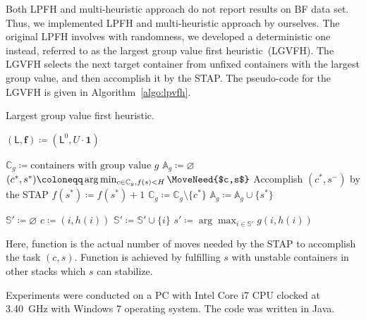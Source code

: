 \documentclass[review,3p,times,12pt,number]{elsarticle}\usepackage{amsmath}\usepackage{amssymb}
\renewcommand{\gets}{\coloneqq}
\newcommand{\setalgo}{\linespread{1}\fontsize{10}{12}\selectfont}
\begin{document}
Both LPFH and multi-heuristic approach do not report results on BF data set. Thus, we implemented LPFH and multi-heuristic approach by ourselves.
The original LPFH involves with randomness, we developed a deterministic one instead, referred to as the largest group value first heuristic~(LGVFH). The LGVFH selects the next target container from unfixed containers with the largest group value, and then accomplish it by the STAP\@. The pseudo-code for the LGVFH is given in Algorithm~\ref{algo:lpvfh}.

\begin{algorithm*}[htbp]
\caption{Largest group value first heuristic.}
\label{algo:lpvfh}


\setalgo

\begin{multicols}{2}

\Begin
{
  $(\mathsf{L},\boldsymbol{f})\gets (\mathsf{L}^0,U\cdot\boldsymbol{1})$\;

  {
    $\mathbb{C}_g\gets\textrm{containers with group value $g$}$\;
    $\mathbb{A}_g\gets\varnothing$
    {
      $(c^*, s^*)\gets \arg\min_{c\in\mathbb{C}_g, f(s)<H} \MoveNeed{$c,s$}$\;
      Accomplish $( c^*, s^-)$ by the STAP\;
      $f(s^*)\gets f(s^*)+1$\;
      $\mathbb{C}_g\gets\mathbb{C}_g\setminus\{c^*\}$\;
      $\mathbb{A}_g\gets \mathbb{A}_g\cup \{s^*\}$\;
    }
    {
    	\;
    }
  }
}



{
  {
    $\mathbb{S}'\gets\varnothing$\;
    {
      $c\gets (i,h(i))$\;
      {
        $\mathbb{S}'\gets \mathbb{S}'\cup \{i\}$\;
      }
    }
    {
      $s'\gets \arg\max_{i\in\mathbb{S}'} g(i,h(i))$\;
      \;
    }
    {
      \Break\;
    }
  }
}
\end{multicols}
\BlankLine
\BlankLine
\end{algorithm*}

Here, function  is the actual number of moves needed by the STAP to accomplish the task $(c,s)$. Function  is achieved by fulfilling $s$ with unstable containers in other stacks which $s$ can stabilize.

Experiments were conducted on a PC with Intel Core i7 CPU clocked at 3.40~GHz with Windows 7 operating system. The code was written in Java.
\end{document}
